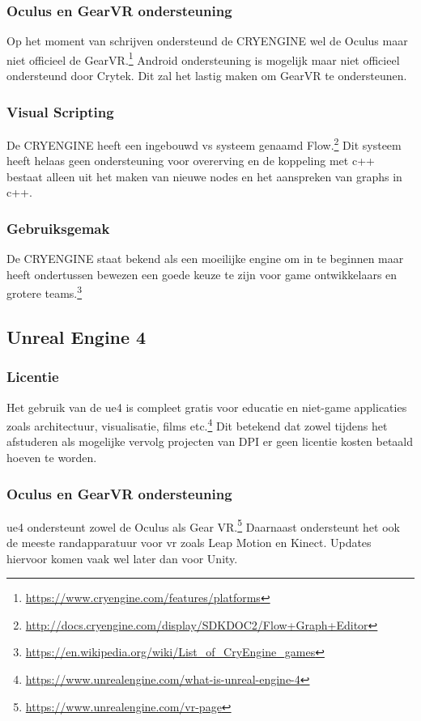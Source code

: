 \subsubsection{Oculus en GearVR ondersteuning}
Op het moment van schrijven ondersteund de CRYENGINE wel de Oculus maar niet officieel de GearVR.\footnote{\url{https://www.cryengine.com/features/platforms}} Android ondersteuning is mogelijk maar niet officieel ondersteund door Crytek. Dit zal het lastig maken om GearVR te ondersteunen.

\subsubsection{Visual Scripting}
De CRYENGINE heeft een ingebouwd \gls{vs} systeem genaamd Flow.\footnote{\url{http://docs.cryengine.com/display/SDKDOC2/Flow+Graph+Editor}} Dit systeem heeft helaas geen ondersteuning voor overerving en de koppeling met c++ bestaat alleen uit het maken van nieuwe nodes en het aanspreken van graphs in c++.

\subsubsection{Gebruiksgemak}
De CRYENGINE staat bekend als een moeilijke engine om in te beginnen maar heeft ondertussen bewezen een goede keuze te zijn voor game ontwikkelaars en grotere teams.\footnote{\url{https://en.wikipedia.org/wiki/List_of_CryEngine_games}}

\subsection{Unreal Engine 4}
\subsubsection{Licentie}
Het gebruik van de \gls{ue4} is compleet gratis voor educatie en niet-game applicaties zoals architectuur, visualisatie, films etc.\footnote{\url{https://www.unrealengine.com/what-is-unreal-engine-4}} Dit betekend dat zowel tijdens het afstuderen als mogelijke vervolg projecten van DPI er geen licentie kosten betaald hoeven te worden.

\subsubsection{Oculus en GearVR ondersteuning}
\gls{ue4} ondersteunt zowel de Oculus als Gear VR.\footnote{\url{https://www.unrealengine.com/vr-page}} Daarnaast ondersteunt het ook de meeste randapparatuur voor \gls{vr} zoals Leap Motion en Kinect. Updates hiervoor komen vaak wel later dan voor Unity.

